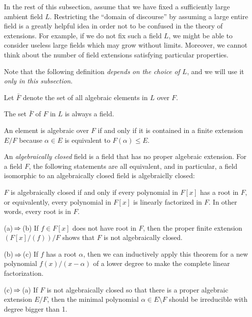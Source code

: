 \documentclass{../../large}
\begin{document}
In the rest of this subsection, assume that we have fixed a sufficiently large ambient field $L$.
Restricting the ``domain of discourse'' by assuming a large entire field is a greatly helpful idea in order not to be confused in the theory of extensions.
For example, if we do not fix such a field $L$, we might be able to consider useless large fields which may grow without limits.
Moreover, we cannot think about the number of field extensions satisfying particular properties.

Note that the following definition \emph{depends on the choice of $L$}, and we will use it \emph{only in this subsection}.
\begin{defn}
Let $\bar F$ denote the set of all algebraic elements in $L$ over $F$.
\end{defn}
\begin{prop}
The set $\bar F$ of $F$ in $L$ is always a field.
\end{prop}
\begin{pf}
An element is algebraic over $F$ if and only if it is contained in a finite extension $E/F$ because $\alpha\in E$ is equivalent to $F(\alpha)\le E$.

\end{pf}









\begin{prb}
An \emph{algebraically closed} field is a field that has no proper algebraic extension.
For a field $F$, the following statements are all equivalent, and in particular, a field isomorphic to an algebraically closed field is algebraiclly closed:
\begin{parts}
\item $F$ is algebraically closed if and only if every polynomial in $F[x]$ has a root in $F$, or equivalently, every polynomial in $F[x]$ is linearly factorized in $F$. In other words, every root is in $F$.
\end{parts}
\end{prb}
\begin{pf}
(a)$\impl$(b)
If $f\in F[x]$ does not have root in $F$, then the proper finite extension $(F[x]/(f))/F$ shows that $F$ is not algebraically closed.

(b)$\impl$(c)
If $f$ has a root $\alpha$, then we can inductively apply this theorem for a new polynomial $f(x)/(x-\alpha)$ of a lower degree to make the complete linear factorization.

(c)$\impl$(a)
If $F$ is not algebraically closed so that there is a proper algebraic extension $E/F$, then the minimal polynomial $\alpha\in E\setminus F$ should be irreducible with degree bigger than 1.
\end{pf}
\end{document}
